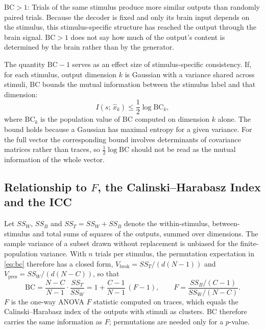 \documentclass[11pt,a4paper]{article}
\begin{document}
\textbf{$\mathrm{BC}>1$}: Trials of the same stimulus produce more similar
outputs than randomly paired trials. Because the decoder is fixed and only its
brain input depends on the stimulus, this stimulus-specific structure has
reached the output through the brain signal. $\mathrm{BC}>1$ does not say how
much of the output's content is determined by the brain rather than by the
generator.

The quantity $\mathrm{BC}-1$ serves as an effect size of stimulus-specific
consistency. If,
for each stimulus, output dimension $k$ is Gaussian with a variance shared
across stimuli, BC bounds the mutual information between the stimulus label and
that dimension:
\begin{equation}
  I(s;\,\hat{x}_k)
  \le \frac{1}{2}\log\mathrm{BC}_k,
  \label{eq:mi}
\end{equation}
where $\mathrm{BC}_k$ is the population value of BC computed on dimension $k$
alone. The bound holds because a Gaussian has maximal entropy for a given
variance. For the full vector the corresponding bound involves determinants of
covariance matrices rather than traces, so $\frac{1}{2}\log\mathrm{BC}$ should
not be read as the mutual information of the whole vector.

\subsection{Relationship to \texorpdfstring{$F$}{F}, the Calinski--Harabasz Index and the ICC}
\label{sec:anova}

Let $SS_W$, $SS_B$ and $SS_T=SS_W+SS_B$ denote the within-stimulus,
between-stimulus and total sums of squares of the outputs, summed over
dimensions. The sample variance of a subset drawn without replacement is
unbiased for the finite-population variance. With $n$ trials per stimulus, the
permutation expectation in \cref{eq:bc} therefore has a closed form,
$V_\mathrm{brok}=SS_T/(d(N-1))$ and $V_\mathrm{pres}=SS_W/(d(N-C))$, so that
\begin{equation}
  \mathrm{BC}
  = \frac{N-C}{N-1}\cdot\frac{SS_T}{SS_W}
  = 1 + \frac{C-1}{N-1}\,(F-1),
  \qquad
  F = \frac{SS_B/(C-1)}{SS_W/(N-C)}.
  \label{eq:anova}
\end{equation}
$F$ is the one-way ANOVA $F$ statistic computed on traces, which equals the
Calinski--Harabasz index \citep{calinski1974} of the outputs with stimuli as
clusters. BC therefore carries the same information as $F$; permutations are
needed only for a $p$-value.
\end{document}
